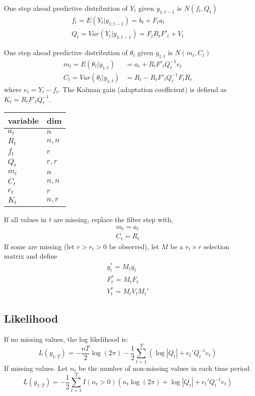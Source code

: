 \documentclass{article}
\begin{document}
One step ahead predictive distribution of $Y_{t}$ given $y_{1:t-1}$ is $N(f_{t}, Q_{t})$
\begin{align*}
  f_{t} = E(Y_{t} | y_{1:t-1}) = b_{t} + F_{t} a_{t} \\
  Q_{t} = Var(Y_{t} | y_{1:t-1}) = F_{t} R_{t} F'_{t} + V_{t}
\end{align*}

One step ahead predictive distribution of $\theta_{t}$ given $y_{1:t}$ is $N(m_{t}, C_{t})$
\begin{align*}
  m_{t} = E(\theta_{t} | y_{1:t}) &= a_{t} + R_{t} F'_{t} Q_{t}^{-1} e_{t} \\
  C_{t} = Var(\theta_{t} | y_{1:t}) &= R_{t} - R_{t} F'_{t} Q_{t}^{-1} F_{t} R_{t}
\end{align*}
where $e_{t} = Y_{t} - f_{t}$. The Kalman gain (adaptation coefficient) is defiend as $K_{t} = R_{t} F'_{t} Q_{t}^{-1}$.
\begin{center}
  \begin{tabular}[]{ll}
    \hline
    variable & dim \\
    \hline
    $a_{t}$ & $n$ \tabularnewline
    $R_{t}$ & $n, n$ \tabularnewline
    $f_{t}$ & $r$ \tabularnewline
    $Q_{t}$ & $r, r$ \tabularnewline
    $m_{t}$ & $n$ \tabularnewline
    $C_{t}$ & $n, n$ \tabularnewline
    $e_{t}$ & $r$ \tabularnewline
    $K_{t}$ & $n, r$ 
  \end{tabular}
\end{center}
If all values in $t$ are missing, replace the filter step with,
\begin{align*}
  m_{t} = a_{t} \\
  C_{t} = R_{t} 
\end{align*}
If some are missing (let $r > r_{t} > 0$ be observed), let $M$ be a $r_{t} \times r$ selection matrix and define
\begin{align*}
  y^{*}_{t} = M_{t} y_{t} \\
  F^{*}_{t} = M_{t} F_{t} \\
  V^{*}_{t} = M_{t} V_{t} M_{t}'
\end{align*}

\subsection{Likelihood}
\label{sec:likelihood}

If no missing values, the log likelihood is:
\begin{equation*}
  L(y_{1:T}) =  - \frac{n T}{2} \log (2 \pi) - \frac{1}{2} \sum_{t=1}^{T}
  \left(
    \log | Q_{t} | + e_{t}' Q_{t}^{-1} e_{t}
  \right)
\end{equation*}
If missing values. Let $n_{t}$ be the number of non-missing values in each time period.
\begin{equation*}
  L(y_{1:T}) = 
  -\frac{1}{2} \sum_{t=1}^{T} 
  I(n_{t} > 0) 
  \left(
    n_{t} \log (2 \pi)
    + \log | Q_{t} | + e_{t}' Q_{t}^{-1} e_{t}
  \right)
\end{equation*}
\end{document}
